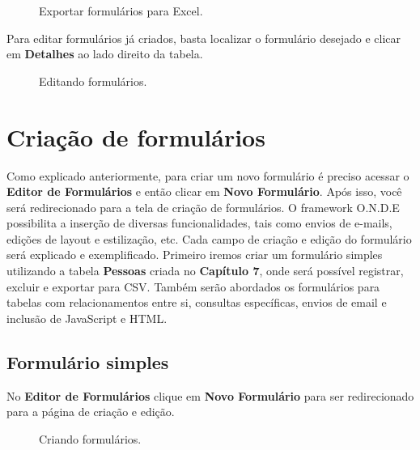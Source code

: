 \documentclass[9pt]{report}
\begin{document}
{     \begin{figure}[H]
      \caption{Exportar formulários para Excel.}
      \label{fig:exportExcel}
     \end{figure}

     Para editar formulários já criados, basta localizar o formulário
     desejado e clicar em \textbf{Detalhes} ao lado direito da tabela.

     \begin{figure}[H]
      \caption{Editando formulários.}
      \label{fig:detalhesForms}
     \end{figure}
        
     \section{Criação de formulários}

     Como explicado anteriormente, para criar um novo formulário é
     preciso acessar o \textbf{Editor de Formulários} e então clicar
     em \textbf{Novo Formulário}. Após isso, você será redirecionado
     para a tela de criação de formulários. O framework O.N.D.E
     possibilita a inserção de diversas funcionalidades, tais como
     envios de e-mails, edições de layout e estilização, etc. Cada
     campo de criação e edição do formulário será explicado e
     exemplificado. Primeiro iremos criar um formulário simples
     utilizando a tabela \textbf{Pessoas} criada no
     \textbf{Capítulo 7}, onde será possível registrar, excluir e
     exportar para CSV. Também serão abordados os formulários para
     tabelas com relacionamentos entre si, consultas específicas,
     envios de email e inclusão de JavaScript e HTML.

      \subsection{Formulário simples}

      No \textbf{Editor de Formulários} clique em
      \textbf{Novo Formulário} para ser redirecionado para a página
      de criação e edição.

     \begin{figure}[H]
      \caption{Criando formulários.}
      \label{fig:editorform}
     \end{figure}

}
\end{document}
